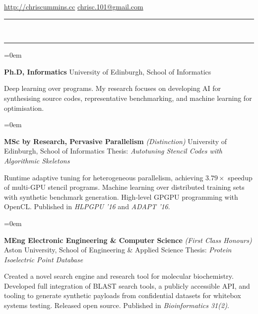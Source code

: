 \documentclass[a4paper,11pt,hidelinks]{scrartcl}
\date{}
\newcommand{\MarginText}[1]{\marginpar{\raggedleft\itshape\normalsize#1}}
\newcommand{\Title}[1]{\noindent\rule{15cm}{0.4pt}\vspace{-.45em}\\
\noindent\spacedlowsmallcaps{\color{titlecolour}{#1}}

\vspace{-.85em}\noindent\rule{15cm}{0.4pt}\vspace{.2em}}
\newcommand{\Description}[1]{\hangindent=0em\hangafter=0%
\noindent\normalsize{#1}\vspace{1em}}
\begin{document}
\thispagestyle{empty}


\begin{cv}{}\vspace{.5em}

\noindent\href{http://chriscummins.cc/}{http://chriscummins.cc} \hfill
\noindent\href{mailto:chrisc.101@gmail.com}{chrisc.101@gmail.com}\\
\vspace{-.5em}


\Title{Education}

\Description{\MarginText{2018\\(expected)}\textbf{Ph.D, Informatics}
  \newline University of Edinburgh, School of Informatics
  \newline\vspace{-.8em}

  \noindent Deep learning over programs. My research focuses on
  developing AI for synthesising source codes, representative
  benchmarking, and machine learning for optimisation.%
}

\Description{\MarginText{2015}\textbf{MSc by Research, Pervasive Parallelism}
  \textit{(Distinction)}
  \newline University of Edinburgh, School of Informatics
  \newline Thesis: \textit{Autotuning Stencil Codes with Algorithmic
    Skeletons}
  \newline\vspace{-.8em}

  \noindent Runtime adaptive tuning for heterogeneous parallelism,
  achieving $3.79\times$ speedup of multi-GPU stencil
  programs. Machine learning over distributed training sets with
  synthetic benchmark generation. High-level GPGPU programming with
  OpenCL. Published in \textit{HLPGPU '16} and \textit{ADAPT '16}.%
}

\Description{\MarginText{2014}\textbf{MEng Electronic Engineering \& Computer Science}
  \textit{(First Class Honours)}
  \newline Aston University, School of Engineering \& Applied Science
  \newline Thesis: \textit{Protein Isoelectric Point Database}
  \newline\vspace{-.8em}

  \noindent Created a novel search engine and research tool for
  molecular biochemistry. Developed full integration of BLAST search
  tools, a publicly accessible API, and tooling to generate synthetic
  payloads from confidential datasets for whitebox systems
  testing. Released open source. Published in \textit{Bioinformatics
    31(2)}.%
}



\end{cv}
\end{document}
